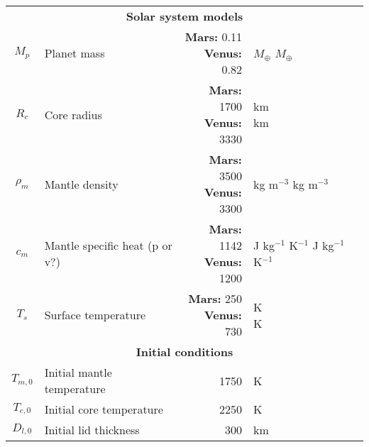 \begin{table}
\begin{tabular}{@{} c l r l p{4cm} @{}}
\midrule
\multicolumn{5}{c}{\textbf{Solar system models}} \\
$M_p$ & Planet mass &  \makecell[tr]{\textbf{Mars:} 0.11 \\ \textbf{Venus:} 0.82} & \makecell[tl]{$M_\oplus$ \\ $M_\oplus$ } &  \\
$R_c$ & Core radius &  \makecell[tr]{\textbf{Mars:} 1700 \\ \textbf{Venus:} 3330} & \makecell[tl]{km \\ km } &  \makecell[tl]{\citet{Thiriet2019} \\ \citet{Huang2013}} \\
$\rho_m$ & Mantle density & \makecell[tr]{\textbf{Mars:} 3500 \\ \textbf{Venus:} 3300} & \makecell[tl]{kg m$^{-3}$ \\ kg m$^{-3}$} &   \makecell[tl]{\citet{Thiriet2019} \\ \citet{Nimmo1996}} \\
$c_m$ & Mantle specific heat (p or v?) & \makecell[tr]{\textbf{Mars:} 1142 \\ \textbf{Venus:} 1200} & \makecell[tl]{J kg$^{-1}$ K$^{-1}$ \\ J kg$^{-1}$ K$^{-1}$}  & \makecell[tl]{\citet{Thiriet2019} \\  \citet{Nimmo1996}}  \\
$T_s$ & Surface temperature & \makecell[tr]{\textbf{Mars:} 250 \\ \textbf{Venus:} 730} & \makecell[tl]{K \\ K} \\

\midrule
\multicolumn{5}{c}{\textbf{Initial conditions}} \\
$T_{m,0}$ & Initial mantle temperature & 1750 & K & \citet{Thiriet2019}\\
$T_{c,0}$ & Initial core temperature & 2250 & K & \citet{Thiriet2019} \\
$D_{l,0}$ & Initial lid thickness & 300 & km & \citet{Thiriet2019}\\
\bottomrule
\end{tabular}



%

\end{table}







